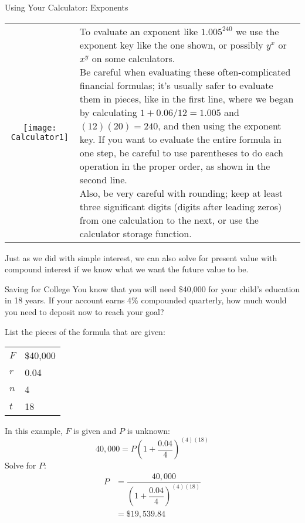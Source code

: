 \begin{proc}{Using Your Calculator: Exponents}
\begin{tabular}{c l}
\texttt{[image: Calculator1]} & \parbox[b]{3in}{To evaluate an exponent like $1.005^{240}$ we use the exponent key like the one shown, or possibly $\boxed{y^x}$ or $\boxed{x^y}$ on some calculators.\\

Be careful when evaluating these often-complicated financial formulas; it's usually safer to evaluate them in pieces, like in the first line, where we began by calculating $1+0.06/12 = 1.005$ and $(12)(20)=240$, and then using the exponent key.  If you want to evaluate the entire formula in one step, be careful to use parentheses to do each operation in the proper order, as shown in the second line.\\

Also, be very careful with rounding; keep at least three significant digits (digits after leading zeros) from one calculation to the next, or use the calculator storage function.}
\end{tabular}
\end{proc}
\vfill

Just as we did with simple interest, we can also solve for present value with compound interest if we know what we want the future value to be.
\vfill

\begin{example}{Saving for College}
You know that you will need \$40,000 for your child's education in 18 years.  If your account earns 4\% compounded quarterly, how much would you need to deposit now to reach your goal?

\sol
List the pieces of the formula that are given:
\begin{center}
\begin{tabular}{l l}
$F$ & \$40,000\\
$r$ & 0.04\\
$n$ & 4\\
$t$ & 18
\end{tabular}
\end{center}
In this example, $F$ is given and $P$ is unknown:
\[40,000 = P\left(1+\dfrac{0.04}{4}\right)^{(4)(18)}\]
Solve for $P$:
\begin{align*}
P &= \dfrac{40,000}{\left(1+\dfrac{0.04}{4}\right)^{(4)(18)}}\\
&= \boxed{\$19,539.84}
\end{align*}
\end{example}
\vfill

